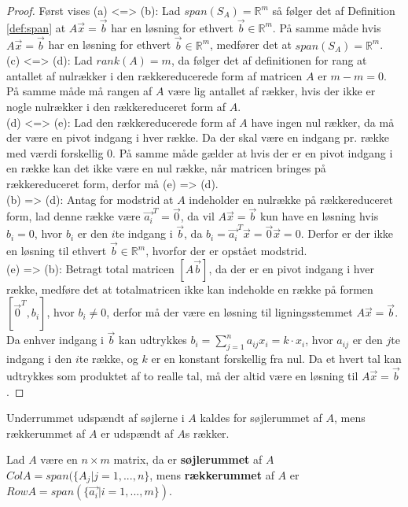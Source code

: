 \begin{proof}
Først vises (a) <=> (b):
Lad $span(S_A) = \mathds{R}^m$ så følger det af Definition \ref{def:span} at $A\vec{x}= \vec{b}$ har en løsning for ethvert $\vec{b} \in \mathds{R}^m$.
På samme måde hvis $A\vec{x}= \vec{b}$ har en løsning for ethvert $\vec{b} \in \mathds{R}^m$, medfører det at $span(S_A) = \mathds{R}^m$. 
\\(c) <=> (d): 
Lad $rank(A) = m$, da følger det af definitionen for rang at antallet af nulrækker i den rækkereducerede form af matricen $A$ er $m-m = 0$.
På samme måde må rangen af $A$ være lig antallet af rækker, hvis der ikke er nogle nulrækker i den rækkereduceret form af $A$.
\\(d) <=> (e):
Lad den rækkereducerede form af $A$ have ingen nul rækker, da må der være en pivot indgang i hver række. 
Da der skal være en indgang pr. række med værdi forskellig $0$. 
På samme måde gælder at hvis der er en pivot indgang i en række kan det ikke være en nul række, når matricen bringes på rækkereduceret form, derfor må (e) => (d).
\\(b) => (d):
Antag for modstrid at $A$ indeholder en nulrække på rækkereduceret form, lad denne række være $\vec{a_i}^T = \vec{0}$, da vil $A\vec{x} = \vec{b}$ kun have en løsning hvis $b_i=0$, hvor $b_i$ er den $i$te indgang i $\vec{b}$, da $b_i = \vec{a_i}^T \vec{x} = \vec{0} \vec{x} = 0$. 
Derfor er der ikke en løsning til ethvert $\vec{b} \in \mathds{R}^m$, hvorfor der er opstået modstrid.
\\(e) => (b): 
Betragt total matricen $[A \vec{b}]$, da der er en pivot indgang i hver række, medføre det at totalmatricen ikke kan indeholde en række på formen $[\vec{0}^T, b_i]$, hvor $b_i \neq 0$, derfor må der være en løsning til ligningsstemmet $A\vec{x} = \vec{b}$.
Da enhver indgang i $\vec{b}$ kan udtrykkes $b_i = \sum_{j=1}^n a_{ij} x_i = k \cdot x_i$, hvor $a_{ij}$ er den $j$te indgang i den $i$te række, og $k$ er en konstant forskellig fra nul.
Da et hvert tal kan udtrykkes som produktet af to realle tal, må der altid være en løsning til $A\vec{x}=\vec{b}$.
\end{proof}
Underrummet udspændt af søjlerne i $A$ kaldes for søjlerummet af $A$, mens rækkerummet af $A$ er udspændt af $A$s rækker.
\begin{defn}
Lad $A$ være en $n\times m$ matrix, da er \textbf{søjlerummet} af $A$ $Col A = span(\{A_j | j =1,...,n\}$, mens \textbf{rækkerummet} af $A$ er $Row A = span(\{\vec{a_i}|i=1,...,m\})$.
\label{def:sojlerum}
\end{defn} 
